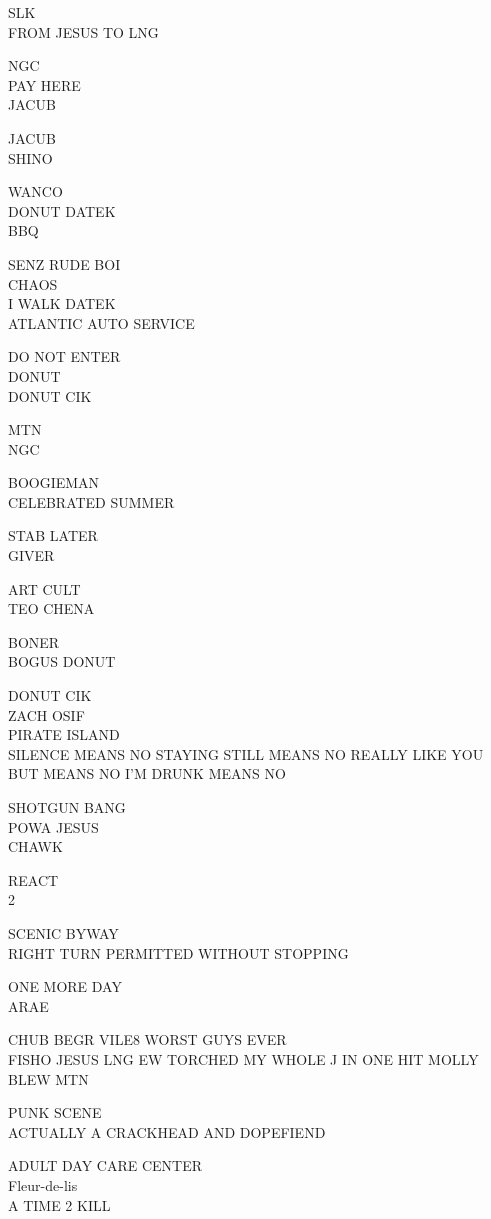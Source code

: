 \documentclass[10pt,letterpaper]{article}
\begin{document}
SLK\\
FROM JESUS TO LNG

NGC\\
PAY HERE\\
JACUB

JACUB\\
SHINO

WANCO\\
DONUT DATEK\\
BBQ

SENZ RUDE BOI\\
CHAOS\\
I WALK  DATEK\\
ATLANTIC AUTO SERVICE

DO NOT ENTER\\
DONUT\\
DONUT CIK

MTN\\
NGC

BOOGIEMAN\\
CELEBRATED SUMMER

STAB LATER\\
GIVER

ART CULT\\
TEO CHENA

BONER\\
BOGUS DONUT

DONUT CIK\\
ZACH OSIF\\
PIRATE ISLAND\\
SILENCE MEANS NO STAYING STILL MEANS NO REALLY LIKE YOU BUT MEANS NO I'M DRUNK MEANS NO

SHOTGUN BANG\\
POWA JESUS\\
CHAWK

REACT\\
2

SCENIC BYWAY\\
RIGHT TURN PERMITTED WITHOUT STOPPING

ONE MORE DAY\\
ARAE

CHUB BEGR VILE8 WORST GUYS EVER\\
FISHO JESUS LNG EW TORCHED MY WHOLE J IN ONE HIT MOLLY BLEW MTN

PUNK SCENE\\
ACTUALLY A CRACKHEAD AND DOPEFIEND

ADULT DAY CARE CENTER\\
Fleur{-}de{-}lis\\
A TIME 2 KILL
\end{document}
